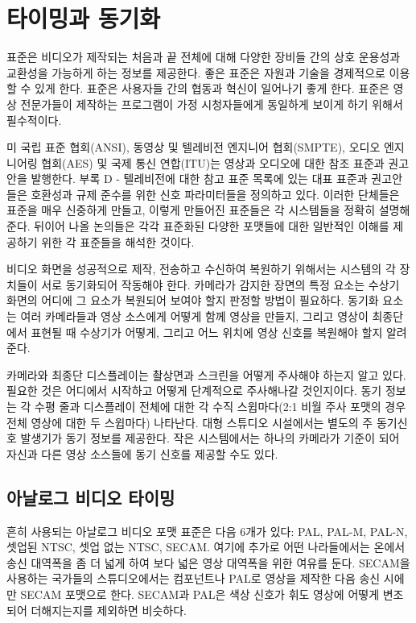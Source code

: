 \chapter{타이밍과 동기화}
표준은 비디오가 제작되는 처음과 끝 전체에 대해 다양한 장비들 간의 상호 운용성과 교환성을 가능하게 하는 정보를 제공한다. 좋은 표준은 자원과 기술을 경제적으로 이용할 수 있게 한다.
표준은 사용자들 간의 협동과 혁신이 일어나기 좋게 한다. 표준은 영상 전문가들이 제작하는 프로그램이 가정 시청자들에게 동일하게 보이게 하기 위해서 필수적이다.

미 국립 표준 협회(ANSI), 동영상 및 텔레비전 엔지니어 협회(SMPTE), 오디오 엔지니어링 협회(AES) 및 국제 통신 연합(ITU)는 영상과 오디오에 대한 참조 표준과 권고안을 발행한다.
부록 D - 텔레비전에 대한 참고 표준 목록에 있는 대표 표준과 권고안들은 호환성과 규제 준수를 위한 신호 파라미터들을 정의하고 있다.
이러한 단체들은 표준을 매우 신중하게 만들고, 이렇게 만들어진 표준들은 각 시스템들을 정확히 설명해준다. 뒤이어 나올 논의들은 각각 표준화된 다양한 포맷들에 대한 일반적인 이해를 제공하기 위한 각 표준들을 해석한 것이다.

비디오 화면을 성공적으로 제작, 전송하고 수신하여 복원하기 위해서는 시스템의 각 장치들이 서로 동기화되어 작동해야 한다. 카메라가 감지한 장면의 특정 요소는 수상기 화면의 어디에 그 요소가 복원되어 보여야 할지 판정할 방법이 필요하다.
동기화 요소는 여러 카메라들과 영상 소스에게 어떻게 함께 영상을 만들지, 그리고 영상이 최종단에서 표현될 때 수상기가 어떻게, 그리고 어느 위치에 영상 신호를 복원해야 할지 알려준다.

카메라와 최종단 디스플레이는 촬상면과 스크린을 어떻게 주사해야 하는지 알고 있다. 필요한 것은 어디에서 시작하고 어떻게 단계적으로 주사해나갈 것인지이다. 동기 정보는 각 수평 줄과 디스플레이 전체에 대한 각 수직 스윕마다(2:1 비월 주사 포맷의 경우 전체 영상에 대한 두 스윕마다) 나타난다.
대형 스튜디오 시설에서는 별도의 주 동기신호 발생기가 동기 정보를 제공한다. 작은 시스템에서는 하나의 카메라가 기준이 되어 자신과 다른 영상 소스들에 동기 신호를 제공할 수도 있다.

\section{아날로그 비디오 타이밍}
흔히 사용되는 아날로그 비디오 포맷 표준은 다음 6개가 있다: PAL, PAL-M, PAL-N, 셋업된 NTSC, 셋업 없는 NTSC, SECAM. 여기에 추가로 어떤 나라들에서는 온에서 송신 대역폭을 좀 더 넓게 하여 보다 넓은 영상 대역폭을 위한 여유를 둔다.
SECAM을 사용하는 국가들의 스튜디오에서는 컴포넌트나 PAL로 영상을 제작한 다음 송신 시에만 SECAM 포맷으로 한다. SECAM과 PAL은 색상 신호가 휘도 영상에 어떻게 변조되어 더해지는지를 제외하면 비슷하다.

